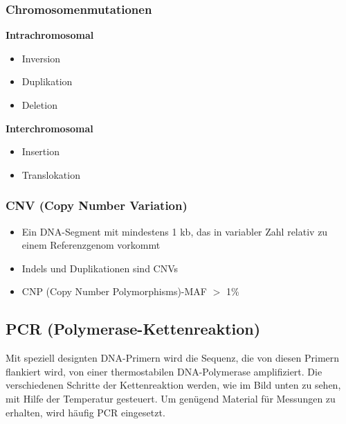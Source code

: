 \subsubsection{Chromosomenmutationen}
\textbf{Intrachromosomal}
    \begin{itemize}
        \item Inversion
        \item Duplikation
        \item Deletion
    \end{itemize}
\textbf{Interchromosomal}
    \begin{itemize}
        \item Insertion
        \item Translokation
    \end{itemize}

\subsubsection{CNV (Copy Number Variation)}
\begin{itemize}
    \item Ein DNA-Segment mit mindestens 1 kb, das in variabler Zahl relativ zu einem Referenzgenom vorkommt
    \item Indels und Duplikationen sind CNVs
    \item CNP (Copy Number Polymorphisms)-MAF $>$ 1\%
\end{itemize}

\subsection{PCR (Polymerase-Kettenreaktion)}
Mit speziell designten DNA-Primern wird die Sequenz, die von diesen Primern flankiert wird, von einer thermostabilen DNA-Polymerase amplifiziert. Die verschiedenen Schritte der Kettenreaktion werden, wie im Bild unten zu sehen, mit Hilfe der Temperatur gesteuert.
Um genügend Material für Messungen zu erhalten, wird häufig PCR eingesetzt.

